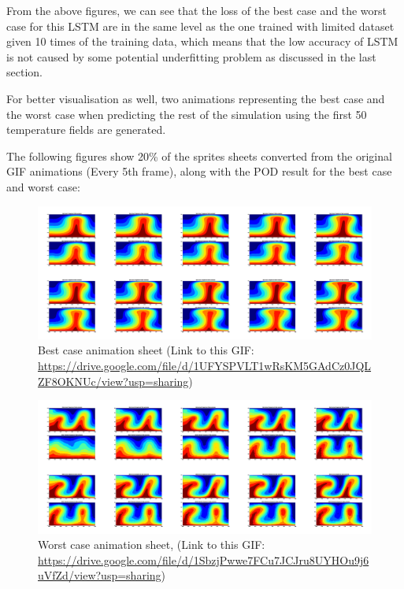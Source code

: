 From the above figures, we can see that the loss of the best case and the worst case for this LSTM are in the same level as the one trained with limited dataset given 10 times of the training data, which means that the low accuracy of LSTM is not caused by some potential underfitting problem as discussed in the last section.

For better visualisation as well, two animations representing the best case and the worst case when predicting the rest of the simulation using the first 50 temperature fields are generated.

The following figures show 20\% of the sprites sheets converted from the original GIF animations (Every 5th frame), along with the POD result for the best case and worst case:

\begin{figure}[H]
    \centering
    \caption{Best case animation sheet (Link to this GIF: \url{https://drive.google.com/file/d/1UFYSPVLT1wRsKM5GAdCz0JQLZF8OKNUc/view?usp=sharing})}
    \includegraphics[scale=0.10]{figures/mantle_convection_images/larger_dataset/LSTM_Best_GIF_sheet.png}
\end{figure}



\begin{figure}[H]
    \centering
    \caption{Worst case animation sheet, (Link to this GIF: 
    \url{https://drive.google.com/file/d/1SbzjPwwe7FCu7JCJru8UYHOu9j6uVfZd/view?usp=sharing})}
    \includegraphics[scale=0.10]{figures/mantle_convection_images/larger_dataset/LSTM_Worst_GIF_sheet.png}
\end{figure}


